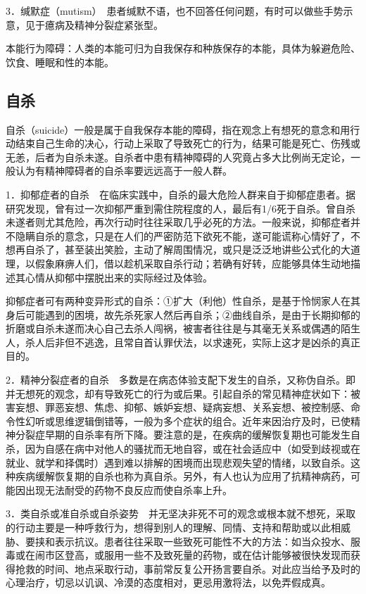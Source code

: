 3．缄默症（mutism）　患者缄默不语，也不回答任何问题，有时可以做些手势示意，见于癔病及精神分裂症紧张型。

本能行为障碍：人类的本能可归为自我保存和种族保存的本能，具体为躲避危险、饮食、睡眠和性的本能。

\subsection{自杀}

自杀（suicide）一般是属于自我保存本能的障碍，指在观念上有想死的意念和用行动结束自己生命的决心，行动上采取了导致死亡的行为，结果可能是死亡、伤残或无恙，后者为自杀未遂。自杀者中患有精神障碍的人究竟占多大比例尚无定论，一般认为有精神障碍者的自杀率要远远高于一般人群。

1．抑郁症者的自杀　在临床实践中，自杀的最大危险人群来自于抑郁症患者。据研究发现，曾有过一次抑郁严重到需住院程度的人，最后有1/6死于自杀。曾自杀未遂者则尤其危险，再次行动时往往采取几乎必死的方法。一般来说，抑郁症者并不隐瞒自杀的意念，只是在人们的严密防范下欲死不能，遂可能谎称心情好了，不想再自杀了，甚至装出笑脸，主动了解周围情况，或只是泛泛地讲些公式化的大道理，以假象麻痹人们，借以趁机采取自杀行动；若确有好转，应能够具体生动地描述其心情从抑郁中摆脱出来的实际经过及体验。

抑郁症者可有两种变异形式的自杀：①扩大（利他）性自杀，是基于怜悯家人在其身后可能遇到的困境，故先杀死家人然后再自杀；②曲线自杀，是由于长期抑郁的折磨或自杀未遂而决心自己去杀人闯祸，被害者往往是与其毫无关系或偶遇的陌生人，杀人后非但不逃逸，且常自首认罪伏法，以求速死，实际上这才是凶杀的真正目的。

2．精神分裂症者的自杀　多数是在病态体验支配下发生的自杀，又称伪自杀。即并无想死的观念，却有导致死亡的行为或后果。引起自杀的常见精神症状如下：被害妄想、罪恶妄想、焦虑、抑郁、嫉妒妄想、疑病妄想、关系妄想、被控制感、命令性幻听或思维逻辑倒错等，一般为多个症状的组合。近年来因治疗及时，已使精神分裂症早期的自杀率有所下降。要注意的是，在疾病的缓解恢复期也可能发生自杀，因为自感在病中对他人的骚扰而无地自容，或在社会适应中（如受到歧视或在就业、就学和择偶时）遇到难以排解的困境而出现悲观失望的情绪，以致自杀。这种疾病缓解恢复期的自杀也称为真自杀。另外，有人也认为应用了抗精神病药，可能因出现无法耐受的药物不良反应而使自杀率上升。

3．类自杀或准自杀或自杀姿势　并无坚决非死不可的观念或根本就不想死，采取的行动主要是一种呼救行为，想得到别人的理解、同情、支持和帮助或以此相威胁、要挟和表示抗议。患者往往采取一些致死可能性不大的方法：如当众投水、服毒或在闹市区登高，或服用一些不及致死量的药物，或在估计能够被很快发现而获得抢救的时间、地点采取行动，事前常反复公开扬言要自杀。对此应当给予及时的心理治疗，切忌以讥讽、冷漠的态度相对，更忌用激将法，以免弄假成真。

